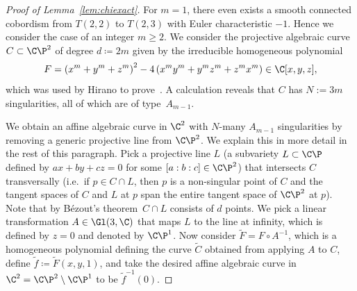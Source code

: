 \begin{proof}[Proof of Lemma~\ref{lem:chiexact}]
For $m=1$, there even exists a smooth connected cobordism from $T(2,2)$ to $T(2,3)$ with Euler characteristic $-1$. Hence we consider the case of an integer $m\geq 2$. We consider the projective algebraic curve $C\subset \C\P^2$ of degree $d\coloneqq 2m$ given by the irreducible homogeneous polynomial
\[
F= \left(x^{m}+y^{m}+z^{m}\right)^2-4\left(x^{m}y^{m}+y^{m}z^{m}+z^{m}x^{m}\right)\in\C[x,y,z],
\]
which was used by Hirano to prove~\cite[Theorem~2]{Hirano_92}. A calculation reveals that $C$ has $N:= 3m$ singularities, all of which are of type~$A_{m-1}$.

We obtain an affine algebraic curve in $\C^2$ with $N$-many $A_{m-1}$ singularities by removing a generic projective line from $\C\P^2$. We explain this in more detail in the rest of this paragraph. Pick a projective line $L$ (a subvariety $L\subset \C\P$ defined by $ax+by+cz=0$ for some $[a:b:c]\in\C\P^2$) that intersects $C$ transversally (i.e.~if $p\in C\cap L$, then $p$ is a non-singular point of $C$ and the tangent spaces of $C$ and $L$ at $p$ span the entire tangent space of $\C\P^2$ at $p$). Note that by Bézout's theorem~$C\cap L$ consists of $d$ points. We pick a linear transformation $A\in \Gl(3,\C)$ that maps $L$ to the line at infinity, which is defined by $z=0$ and denoted by $\C\P^1$. Now consider $\widetilde{F}=F\circ A^{-1}$, which is a homogeneous polynomial defining the curve $\widetilde{C}$ obtained from applying $A$ to $C$, define $\widetilde{f}\coloneqq \widetilde{F}(x,y,1)$, and take the desired affine algebraic curve in $\C^2=\C\P^2\setminus \C\P^1$ to be $\widetilde{f}^{-1}(0)$.


\end{proof}

